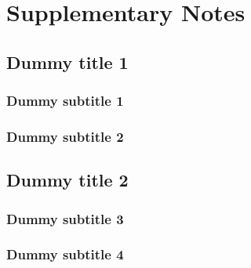 \section{Supplementary Notes}

\subsection{Dummy title 1}\label{suppnote:dummy1}
\lipsum[1]

\subsubsection*{Dummy subtitle 1}\label{suppnote:dummysub1}
\lipsum[2-3]

\subsubsection*{Dummy subtitle 2}\label{suppnote:dummysub2}
\lipsum[4-5]



\subsection{Dummy title 2}\label{suppnote:dummy2}
\lipsum[1]

\subsubsection*{Dummy subtitle 3}\label{suppnote:dummysub3}
\lipsum[2-3]

\subsubsection*{Dummy subtitle 4}\label{suppnote:dummysub4}
\lipsum[4-5]

